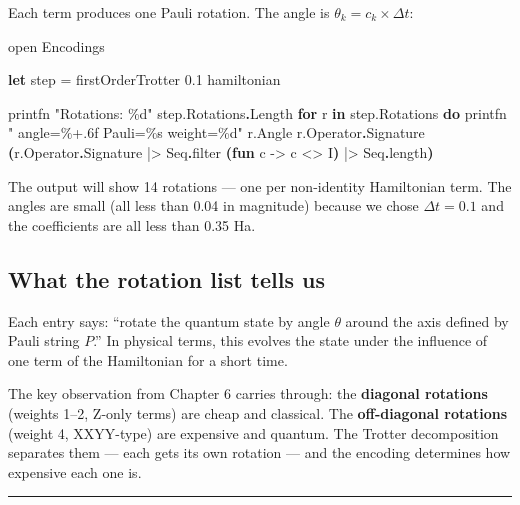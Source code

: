 \documentclass[
  11pt,
  oneside]{book}
\newenvironment{Shaded}{\begin{snugshade}}{\end{snugshade}}
\newcommand{\CharTok}[1]{\textcolor[rgb]{0.31,0.60,0.02}{#1}}
\newcommand{\FloatTok}[1]{\textcolor[rgb]{0.00,0.00,0.81}{#1}}
\newcommand{\KeywordTok}[1]{\textcolor[rgb]{0.13,0.29,0.53}{\textbf{#1}}}
\newcommand{\NormalTok}[1]{#1}
\newcommand{\OperatorTok}[1]{\textcolor[rgb]{0.81,0.36,0.00}{\textbf{#1}}}
\newcommand{\OtherTok}[1]{\textcolor[rgb]{0.56,0.35,0.01}{#1}}
\newcommand{\StringTok}[1]{\textcolor[rgb]{0.31,0.60,0.02}{#1}}
\begin{document}
Each term produces one Pauli rotation. The angle is
\(\theta_k = c_k \times \Delta t\):

\begin{Shaded}
\begin{Highlighting}[]
\OtherTok{open}\NormalTok{ Encodings}

\KeywordTok{let}\NormalTok{ step = firstOrderTrotter }\FloatTok{0.1}\NormalTok{ hamiltonian}

\NormalTok{printfn }\StringTok{"Rotations: \%d"}\NormalTok{ step.Rotations}\KeywordTok{.}\NormalTok{Length}
\KeywordTok{for}\NormalTok{ r }\KeywordTok{in}\NormalTok{ step.Rotations }\KeywordTok{do}
\NormalTok{    printfn }\StringTok{"  angle=\%+.6f  Pauli=\%s  weight=\%d"}
\NormalTok{        r.Angle}
\NormalTok{        r.Operator}\KeywordTok{.}\NormalTok{Signature}
        \OperatorTok{(}\NormalTok{r.Operator}\KeywordTok{.}\NormalTok{Signature |\textgreater{} Seq}\KeywordTok{.}\NormalTok{filter }\OperatorTok{(}\KeywordTok{fun}\NormalTok{ c {-}\textgreater{} c \textless{}\textgreater{} }\CharTok{\textquotesingle{}I\textquotesingle{}}\OperatorTok{)}\NormalTok{ |\textgreater{} Seq}\KeywordTok{.}\NormalTok{length}\OperatorTok{)}
\end{Highlighting}
\end{Shaded}

The output will show 14 rotations --- one per non-identity Hamiltonian
term. The angles are small (all less than 0.04 in magnitude) because we
chose \(\Delta t = 0.1\) and the coefficients are all less than 0.35 Ha.

\subsection{What the rotation list tells
us}\label{what-the-rotation-list-tells-us}

Each entry says: ``rotate the quantum state by angle \(\theta\) around
the axis defined by Pauli string \(P\).'' In physical terms, this
evolves the state under the influence of one term of the Hamiltonian for
a short time.

The key observation from Chapter 6 carries through: the \textbf{diagonal
rotations} (weights 1--2, Z-only terms) are cheap and classical. The
\textbf{off-diagonal rotations} (weight 4, XXYY-type) are expensive and
quantum. The Trotter decomposition separates them --- each gets its own
rotation --- and the encoding determines how expensive each one is.

\begin{center}\rule{0.5\linewidth}{0.5pt}\end{center}
\end{document}
